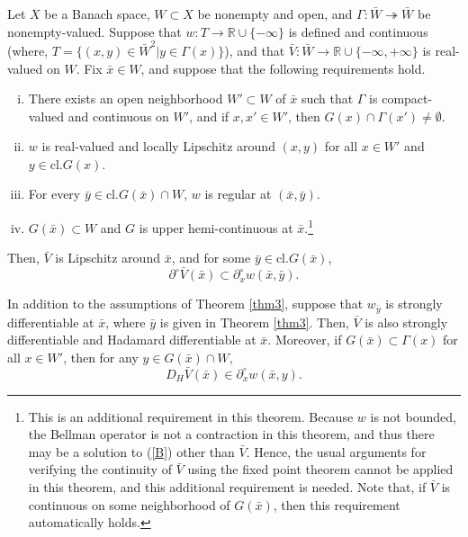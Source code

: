\documentclass[10pt,a4paper]{amsart}
\begin{document}
\begin{thm}\label{thm3}
Let $X$ be a Banach space, $W\subset X$ be nonempty and open, and $\Gamma:\bar{W}\twoheadrightarrow \bar{W}$ be nonempty-valued. Suppose that $w:T\to \mathbb{R}\cup \{-\infty\}$ is defined and continuous (where, $T=\{(x,y)\in \bar{W}^2|y\in \Gamma(x)\}$), and that $\bar{V}:\bar{W}\to \mathbb{R}\cup \{-\infty,+\infty\}$ is real-valued on $W$. Fix $\bar{x}\in W$, and suppose that the following requirements hold.
\begin{enumerate}[i)]
\item There exists an open neighborhood $W'\subset W$ of $\bar{x}$ such that $\Gamma$ is compact-valued and continuous on $W'$, and if $x,x'\in W'$, then $G(x)\cap \Gamma(x')\neq \emptyset$.

\item $w$ is real-valued and locally Lipschitz around $(x,y)$ for all $x\in W'$ and $y\in \mbox{cl.}G(x)$.

\item For every $\bar{y}\in \mbox{cl.}G(\bar{x})\cap W$, $w$ is regular at $(\bar{x},\bar{y})$.

\item $G(\bar{x})\subset W$ and $G$ is upper hemi-continuous at $\bar{x}$.\footnote{This is an additional requirement in this theorem. Because $w$ is not bounded, the Bellman operator is not a contraction in this theorem, and thus there may be a solution to (\ref{B}) other than $\bar{V}$. Hence, the usual arguments for verifying the continuity of $\bar{V}$ using the fixed point theorem cannot be applied in this theorem, and this additional requirement is needed. Note that, if $\bar{V}$ is continuous on some neighborhood of $G(\bar{x})$, then this requirement automatically holds.}
\end{enumerate}
Then, $\bar{V}$ is Lipschitz around $\bar{x}$, and for some $\bar{y}\in \mbox{cl.}G(\bar{x})$,
\[\partial^{\circ}\bar{V}(\bar{x})\subset \partial^{\circ}_xw(\bar{x},\bar{y}).\]
\end{thm}

\begin{cor}\label{cor3}
In addition to the assumptions of Theorem \ref{thm3}, suppose that $w_{\bar{y}}$ is strongly differentiable at $\bar{x}$, where $\bar{y}$ is given in Theorem \ref{thm3}. Then, $\bar{V}$ is also strongly differentiable and Hadamard differentiable at $\bar{x}$. Moreover, if $G(\bar{x})\subset \Gamma(x)$ for all $x\in W'$, then for any $y\in G(\bar{x})\cap W$, 
\[D_H\bar{V}(\bar{x})\in \partial^{\circ}_xw(\bar{x},y).\]
\end{cor}
\end{document}
